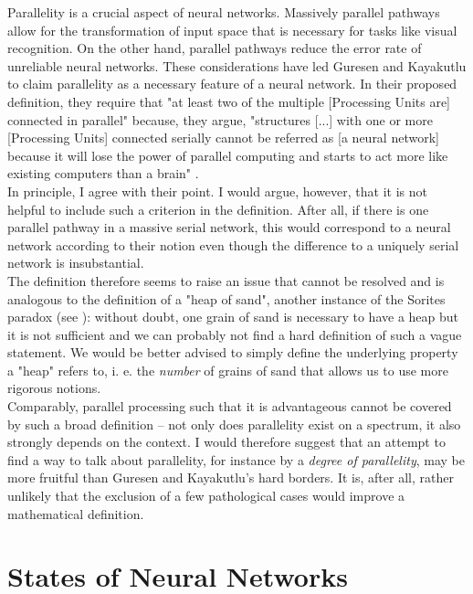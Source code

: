 \documentclass[a4paper,11pt]{report}
\begin{document}
\begin{Par}[Parallelity]
Parallelity is a crucial aspect of neural networks. Massively parallel pathways allow for the transformation of input space that is necessary for tasks like visual recognition. On the other hand, parallel pathways reduce the error rate of unreliable neural networks. These considerations have led Guresen and Kayakutlu \cite{Guresen2011} to claim parallelity as a necessary feature of a neural network. In their proposed definition, they require that "at least two of the multiple [Processing Units are] connected in parallel" \cite[][428]{Guresen2011} because, they argue, "structures [...] with one or more [Processing Units] connected serially cannot be referred as [a neural network] because it will lose the power of parallel computing and starts to act more like existing computers than a brain" \cite[][428]{Guresen2011}.\\
In principle, I agree with their point. I would argue, however, that it is not helpful to include such a criterion in the definition. After all, if there is one parallel pathway in a massive serial network, this would correspond to a neural network according to their notion even though the difference to a uniquely serial network is insubstantial.\\
The definition therefore seems to raise an issue that cannot be resolved and is analogous to the definition of a "heap of sand", another instance of the Sorites paradox (see \cite{Hyde2014}): without doubt, one grain of sand is necessary to have a heap but it is not sufficient and we can probably not find a hard definition of such a vague statement. We would be better advised to simply define the underlying property a "heap" refers to, i. e. the \emph{number} of grains of sand that allows us to use more rigorous notions.\\
Comparably, parallel processing such that it is advantageous cannot be covered by such a broad definition -- not only does parallelity exist on a spectrum, it also strongly depends on the context. I would therefore suggest that an attempt to find a way to talk about parallelity, for instance by a \emph{degree of parallelity}, may be more fruitful than Guresen and Kayakutlu's hard borders. It is, after all, rather unlikely that the exclusion of a few pathological cases would improve a mathematical definition.
\end{Par}

\section{States of Neural Networks}\label{sec:theory-states}
\end{document}
